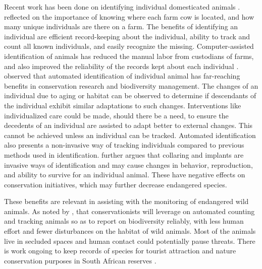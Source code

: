 Recent work has been done on identifying individual domesticated animals \cite{kumar2017real}. \citeauthor{kumar2017real} \citeyear{kumar2017real} \cite{kumar2017real} reflected on the importance of knowing where each farm cow is located, and how many unique individuals are there on a farm. The benefits of identifying an individual are efficient record-keeping about the individual, ability to track and count all known individuals, and easily recognize the missing. Computer-assisted identification of animals has reduced the manual labor from custodians of farms, and also improved the reliability of the records kept about each individual \cite{kuhl2013animal}. \citeauthor{kuhl2013animal} \citeyear{kuhl2013animal} \cite{kuhl2013animal} observed that automated identification of individual animal has far-reaching benefits in conservation research and biodiversity management. The changes of an individual due to aging or habitat can be observed to determine if descendants of the individual exhibit similar adaptations to such changes. Interventions like individualized care could be made, should there be a need, to ensure the decedents of an individual are assisted to adapt better to external changes. This cannot be achieved unless an individual can be tracked. Automated identification also presents a non-invasive way of tracking individuals compared to previous methods used in identification. \citeauthor{kuhl2013animal} \citeyear{kuhl2013animal} \cite{kuhl2013animal} further argues that collaring and implants are invasive ways of identification and may cause changes in behavior, reproduction, and ability to survive for an individual animal. These have negative effects on conservation initiatives, which may further decrease endangered species.

These benefits are relevant in assisting with the monitoring of endangered wild animals. As noted by \citeauthor{norouzzadeh2018automatically} \citeyear{norouzzadeh2018automatically} \cite{norouzzadeh2018automatically}, that conservationists will leverage on automated counting and tracking animals so as to report on biodiversity reliably, with less human effort and fewer disturbances on the habitat of wild animals. Most of the animals live in secluded spaces and human contact could potentially pause threats. There is work ongoing to keep records of species for tourist attraction and nature conservation purposes in South African reserves \cite{marnewick2008evaluating}.

